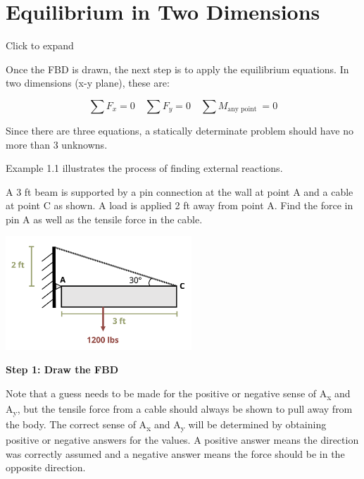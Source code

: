 \documentclass[
  letterpaper,
  DIV=11,
  numbers=noendperiod]{scrreprt}
\begin{document}
\section{Equilibrium in Two
Dimensions}\label{equilibrium-in-two-dimensions}

Click to expand

Once the FBD is drawn, the next step is to apply the equilibrium
equations. In two dimensions (x-y plane), these are:

\[
\sum F_x=0 \quad \sum F_y=0 \quad \sum M_{\text {any point }}=0
\]

Since there are three equations, a statically determinate problem should
have no more than 3 unknowns.

Example 1.1 illustrates the process of finding external reactions.

\begin{tcolorbox}[enhanced jigsaw, colbacktitle=quarto-callout-note-color!10!white, title=\textcolor{quarto-callout-note-color}{\faInfo}\hspace{0.5em}{Example 1.1}, coltitle=black, leftrule=.75mm, rightrule=.15mm, opacityback=0, breakable, colframe=quarto-callout-note-color-frame, left=2mm, arc=.35mm, colback=white, bottomrule=.15mm, bottomtitle=1mm, toptitle=1mm, titlerule=0mm, opacitybacktitle=0.6, toprule=.15mm]

A 3 ft beam is supported by a pin connection at the wall at point A and
a cable at point C as shown. A load is applied 2 ft away from point A.
Find the force in pin A as well as the tensile force in the cable.

\begin{center}
\includegraphics[width=2.75in,height=\textheight]{images/CH1 PNGs/example 1.1 part 1.png}
\end{center}

\textbf{Step 1: Draw the FBD}

Note that a guess needs to be made for the positive or negative sense of
A\textsubscript{x} and A\textsubscript{y}, but the tensile force from a
cable should always be shown to pull away from the body. The correct
sense of A\textsubscript{x} and A\textsubscript{y} will be determined by
obtaining positive or negative answers for the values. A positive answer
means the direction was correctly assumed and a negative answer means
the force should be in the opposite direction.


\end{tcolorbox}
\end{document}
